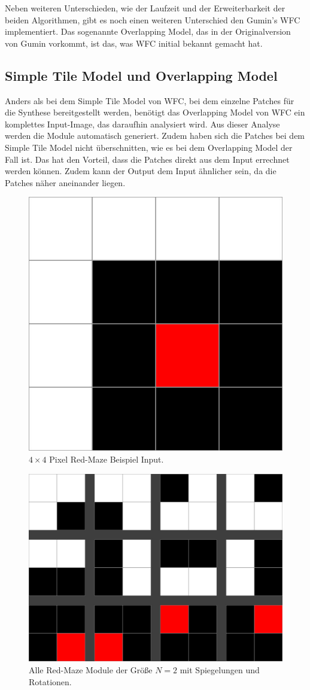 \documentclass[12pt, a4paper,twoside,openright]{report} %
\begin{document}
Neben weiteren Unterschieden, wie der Laufzeit und der Erweiterbarkeit der beiden Algorithmen, gibt es noch einen weiteren Unterschied den Gumin's WFC implementiert.
Das sogenannte Overlapping Model, das in der Originalversion von Gumin vorkommt, ist das, was WFC initial bekannt gemacht hat.

\subsection{Simple Tile Model und Overlapping Model}

Anders als bei dem Simple Tile Model von WFC, bei dem einzelne Patches für die Synthese bereitgestellt werden,
benötigt das Overlapping Model von WFC ein komplettes Input-Image, das daraufhin analysiert wird.
Aus dieser Analyse werden die Module automatisch generiert.
Zudem haben sich die Patches bei dem Simple Tile Model nicht überschnitten, wie es bei dem Overlapping Model der Fall ist.
Das hat den Vorteil, dass die Patches direkt aus dem Input errechnet werden können.
Zudem kann der Output dem Input ähnlicher sein, da die Patches näher aneinander liegen. \cite{merrell2018compare}

\begin{figure}[H]
    \centering
    \includegraphics[width=0.5\linewidth]{images/red-maze.jpg}%
    \caption{$4\times 4$ Pixel Red-Maze Beispiel Input. \cite{Karth2017WaveFunctionCollapseIC}}%
\end{figure}


\begin{figure}[H]
    \centering
    \includegraphics[width=0.5\linewidth]{images/red-maze-modules.jpg}%
    \caption{Alle Red-Maze Module der Größe $N = 2$ mit Spiegelungen und Rotationen. \cite{Karth2017WaveFunctionCollapseIC}}%
\end{figure}
\end{document}
